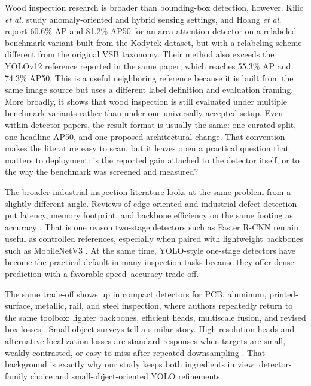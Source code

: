 \documentclass[10pt,a4paper]{article}
\begin{document}
Wood inspection research is broader than bounding-box detection, however. Kilic \textit{et al.} \citep{kilic_2024,kilic_2025_wd_detector} study anomaly-oriented and hybrid sensing settings, and Hoang \textit{et al.} \citep{cmc_wood_area_attention} report 60.6\% AP and 81.2\% AP50 for an area-attention detector on a relabeled benchmark variant built from the Kodytek dataset, but with a relabeling scheme different from the original VSB taxonomy. Their method also exceeds the YOLOv12 reference reported in the same paper, which reaches 55.3\% AP and 74.3\% AP50. This is a useful neighboring reference because it is built from the same image source but uses a different label definition and evaluation framing. More broadly, it shows that wood inspection is still evaluated under multiple benchmark variants rather than under one universally accepted setup. Even within detector papers, the result format is usually the same: one curated split, one headline AP50, and one proposed architectural change. That convention makes the literature easy to scan, but it leaves open a practical question that matters to deployment: is the reported gain attached to the detector itself, or to the way the benchmark was screened and measured?


The broader industrial-inspection literature looks at the same problem from a slightly different angle. Reviews of edge-oriented and industrial defect detection put latency, memory footprint, and backbone efficiency on the same footing as accuracy \citep{mittal_2024,ma_2024_air,wang_2025_ieeeaccess}. That is one reason two-stage detectors such as Faster R-CNN remain useful as controlled references, especially when paired with lightweight backbones such as MobileNetV3 \citep{faster_rcnn,mobilenetv3}. At the same time, YOLO-style one-stage detectors have become the practical default in many inspection tasks because they offer dense prediction with a favorable speed--accuracy trade-off.

The same trade-off shows up in compact detectors for PCB, aluminum, printed-surface, metallic, rail, and steel inspection, where authors repeatedly return to the same toolbox: lighter backbones, efficient heads, multiscale fusion, and revised box losses \citep{cmc_pcb_yolov8,cmc_yolo_rlc,cmc_cg_yolov8,cmc_aluminum_yolov8n,cmc_printed_positive,cmc_channel_shuffle,cmc_insulator_small,cmc_msese,cmc_rail_upernet}. Small-object surveys tell a similar story. High-resolution heads and alternative localization losses are standard responses when targets are small, weakly contrasted, or easy to miss after repeated downsampling \citep{wei_2024_smallreview,hua_2025_smallsurvey}. That background is exactly why our study keeps both ingredients in view: detector-family choice and small-object-oriented YOLO refinements.
\end{document}
